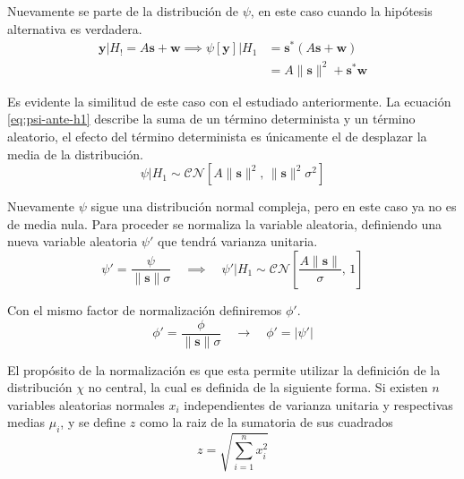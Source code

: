 Nuevamente se parte de la distribución de $\psi$, en este caso cuando la hipótesis alternativa es verdadera.
\begin{equation}\label{eq:psi-ante-h1}
    \begin{aligned} 
        \mathbf{y} | H_! = A\mathbf{s} + \mathbf{w} \implies \psi[\mathbf{y}] | H_1  
        &= \mathbf{s}^\ast\left(A\mathbf{s}+\mathbf{w}\right)\\ 
        &= A\lVert\mathbf{s}\rVert^2+\mathbf{s}^\ast\mathbf{w}
    \end{aligned}
\end{equation}

Es evidente la similitud de este caso con el estudiado anteriormente. La ecuación \ref{eq:psi-ante-h1} describe la suma de un término determinista y un término aleatorio, el efecto del término determinista es únicamente el de desplazar la media de la distribución.
\begin{equation}
    \psi | H_1 \sim \mathcal{CN}\left[A\lVert\mathbf{s}\rVert^2,\,\lVert \mathbf{s}\rVert^2  \sigma^2 \right] 
\end{equation}

Nuevamente $\psi$ sigue una distribución normal compleja, pero en este caso ya no es de media nula. Para proceder se normaliza la variable aleatoria, definiendo una nueva variable aleatoria $\psi'$ que tendrá varianza unitaria.
\begin{equation}
    \psi' = \frac{\psi}{\lVert \mathbf{s} \rVert \sigma} \quad \implies \quad     \psi' | H_1 \sim \mathcal{CN}\left[\frac{A\lVert\mathbf{s}\rVert}{\sigma},\, 1 \right] 
\end{equation}

Con el mismo factor de normalización definiremos $\phi'$.
\begin{equation}
\phi' = \frac{\phi}{\lVert \mathbf{s} \rVert \sigma} \quad \longrightarrow \quad     \phi' = \lvert\psi'\rvert
\end{equation}

El propósito de la normalización es que esta permite utilizar la definición de la distribución $\chi$ no central\cite{distributions}, la cual es definida de la siguiente forma. Si existen $n$ variables aleatorias normales $x_i$ independientes de varianza unitaria y respectivas medias $\mu_i$, y se define $z$ como la raiz de la sumatoria de sus cuadrados
\begin{equation}
    z = \sqrt{\sum_{i=1}^{n}x_i^2}
\end{equation}

